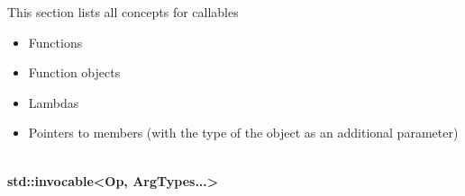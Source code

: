 
This section lists all concepts for callables

\begin{itemize}
\item
Functions

\item
Function objects

\item
Lambdas

\item
Pointers to members (with the type of the object as an additional parameter)
\end{itemize}


\noindent
\hspace*{\fill} \\ %
\textbf{std::invocable<Op, ArgTypes...>}

